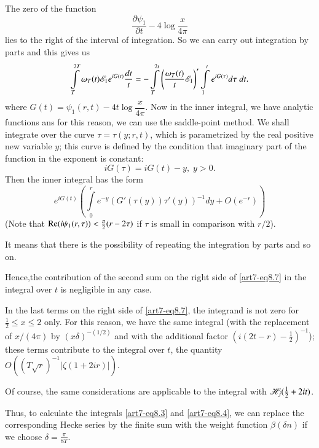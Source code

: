 The zero of the function
$$
\frac{\partial \psi_1}{\partial t} - 4 \log \frac{x}{4\pi}
$$
lies to the right of the interval of integration. So we can carry out integration by parts and this gives us
\begin{equation}
\int\limits^{2T}_T \omega_T (t) \mathscr{E}_1 e^{iG(t)} \frac{dt}{t} = - \int\limits^{2t}_T  \left(\frac{\omega_T (t)}{t} \mathscr{E}_1 \right)' \int\limits^t_1 e^{iG(\tau)} d \tau\; dt.  \label{art7-eq8.12}
\end{equation}
where $G(t) = \psi_1(r,t) - 4 t \log\dfrac{x}{4\pi}$. Now in the inner integral, we have analytic functions ans for this reason, we can use the saddle-point method. We shall integrate over the curve $\tau = \tau (y ; r, t)$, which is parametrized by the real positive new variable $y$; this curve is defined by the condition that imaginary part of the function in the exponent is constant:
\begin{equation}
iG (\tau) = i G (t) - y, \; y >0. \label{art7-eq8.13}
\end{equation}
Then the inner integral has the form 
\begin{equation}
e^{iG(t)} \left(\int\limits^r_0 e^{-y} (G'(\tau(y)) \tau' (y))^{-1} dy + O(e^{-r}) \right) \label{art7-eq8.14}
\end{equation}
(Note that $\operatorname{Re} (i\psi_1 (r,\tau))< \frac{\pi}{2} (r- 2 \tau)$ if $\tau$ is small in comparison with $r /2$).

It means that there is the possibility of repeating the integration by parts and so on.

Hence,\pageoriginale the contribution of the second sum on the right side of \eqref{art7-eq8.7} in the integral over $t$ is negligible in any case.

In the last terms on the right side of \eqref{art7-eq8.7}, the integrand is not zero for $\frac{1}{2} \leqslant x \leqslant 2$ only. For this reason, we have the same integral (with the replacement of $x/(4\pi)$ by $(x\delta)^{-(1/2)}$ and with the additional factor $(i(2t-r)-\frac{1}{2})^{-1}$); these terms contribute to the integral over $t$, the quantity $O((T \sqrt{r})^{-1} |\zeta (1+2 ir)|)$.

Of course, the same considerations are applicable to the integral with $\mathscr{H}_j(\frac{1}{2} + 2 it)$.

Thus, to calculate the integrals \eqref{art7-eq8.3} and \eqref{art7-eq8.4}, we can replace the corresponding Hecke series by the finite sum with the weight function $\beta(\delta n)$ if we choose $\delta = \frac{\pi}{8 T}$.


